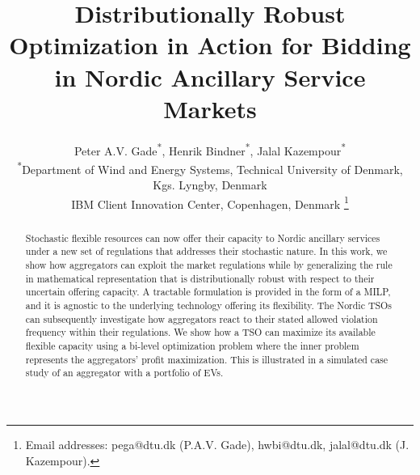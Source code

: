 \documentclass[conference]{IEEEtran}
\begin{document}
\title{Distributionally Robust Optimization in Action for Bidding in Nordic Ancillary Service Markets}

\author{Peter A.V. Gade\textsuperscript{*}\textsuperscript{\textdagger}, Henrik Bindner\textsuperscript{*}, Jalal Kazempour\textsuperscript{*} \\
    \textsuperscript{*}Department of Wind and Energy Systems, Technical University of Denmark, Kgs. Lyngby, Denmark \\
    \textsuperscript{\textdagger}IBM Client Innovation Center, Copenhagen, Denmark
    \thanks{
        Email addresses: pega@dtu.dk (P.A.V. Gade), hwbi@dtu.dk, jalal@dtu.dk (J. Kazempour).}%
    \vspace{-3mm}
}




\maketitle


\IEEEaftertitletext{\vspace{-0.8\baselineskip}}
\maketitle
\thispagestyle{plain}
\pagestyle{plain}
\begin{abstract}
    Stochastic flexible resources can now offer their capacity to Nordic ancillary services under a new set of regulations that addresses their stochastic nature. In this work, we show how aggregators can exploit the market regulations while by generalizing the rule in mathematical representation that is distributionally robust with respect to their uncertain offering capacity. A tractable formulation is provided in the form of a \ac{MILP}, and it is agnostic to the underlying technology offering its flexibility. The Nordic \acp{TSO} can subsequently investigate how aggregators react to their stated allowed violation frequency within their regulations. We show how a \ac{TSO} can maximize its available flexible capacity using a bi-level optimization problem where the inner problem represents the aggregators' profit maximization. This is illustrated in a simulated case study of an aggregator with a portfolio of \acp{EV}.
\end{abstract}
\end{document}
